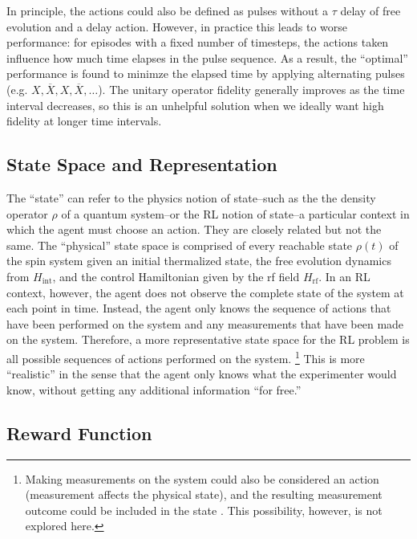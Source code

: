 In principle, the actions could also be defined as pulses without a $\tau$ delay of free evolution and a delay action. However, in practice this leads to worse performance: for episodes with a fixed number of timesteps, the actions taken influence how much time elapses in the pulse sequence. As a result, the ``optimal'' performance is found to minimze the elapsed time by applying alternating pulses (e.g. $X, \overline{X}, X, \overline{X}, \dots$).
The unitary operator fidelity generally improves as the time interval decreases, so this is an unhelpful solution when we ideally want high fidelity at longer time intervals.

\subsection{State Space and Representation}

The ``state'' can refer to the physics notion of state--such as the the density operator $\rho$ of a quantum system--or the RL notion of state--a particular context in which the agent must choose an action. They are closely related but not the same.
The ``physical'' state space is comprised of every reachable state $\rho(t)$ of the spin system given an initial thermalized state, the free evolution dynamics from $H_{\text{int}}$, and the control Hamiltonian given by the rf field $H_{\text{rf}}$.
In an RL context, however, the agent does not observe the complete state of the system at each point in time. Instead, the agent only knows the sequence of actions that have been performed on the system and any measurements that have been made on the system.
Therefore, a more representative state space for the RL problem is all possible sequences of actions performed on the system.%
\footnote{
Making measurements on the system could also be considered an action (measurement affects the physical state), and the resulting measurement outcome could be included in the state \cite{porotti2019coherent}. This possibility, however, is not explored here.
}
This is more ``realistic'' in the sense that the agent only knows what the experimenter would know, without getting any additional information ``for free.''

\subsection{Reward Function}

